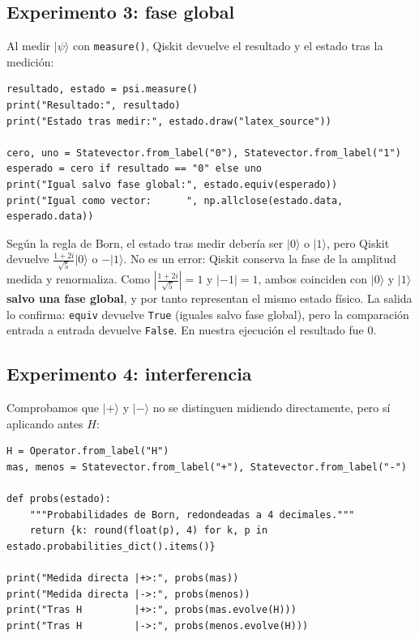 \documentclass[11pt, a4paper, twoside, openright]{report}
\begin{document}
\subsection{Experimento 3: fase global}

\noindent Al medir $|\psi\rangle$ con \texttt{measure()}, Qiskit devuelve el resultado y el estado tras la medición:
\begin{lstlisting}
resultado, estado = psi.measure()
print("Resultado:", resultado)
print("Estado tras medir:", estado.draw("latex_source"))

cero, uno = Statevector.from_label("0"), Statevector.from_label("1")
esperado = cero if resultado == "0" else uno
print("Igual salvo fase global:", estado.equiv(esperado))
print("Igual como vector:      ", np.allclose(estado.data, esperado.data))
\end{lstlisting}

\noindent Según la regla de Born, el estado tras medir debería ser $|0\rangle$ o $|1\rangle$, pero Qiskit devuelve $\frac{1+2i}{\sqrt 5}|0\rangle$ o $-|1\rangle$. No es un error: Qiskit conserva la fase de la amplitud medida y renormaliza. Como $\left|\frac{1+2i}{\sqrt5}\right| = 1$ y $|-1| = 1$, ambos coinciden con $|0\rangle$ y $|1\rangle$ \textbf{salvo una fase global}, y por tanto representan el mismo estado físico. La salida lo confirma: \texttt{equiv} devuelve \texttt{True} (iguales salvo fase global), pero la comparación entrada a entrada devuelve \texttt{False}.
En nuestra ejecución el resultado fue $0$.

\subsection{Experimento 4: interferencia}

\noindent Comprobamos que $|+\rangle$ y $|-\rangle$ no se distinguen midiendo directamente, pero sí aplicando antes $H$:
\begin{lstlisting}
H = Operator.from_label("H")
mas, menos = Statevector.from_label("+"), Statevector.from_label("-")

def probs(estado):
    """Probabilidades de Born, redondeadas a 4 decimales."""
    return {k: round(float(p), 4) for k, p in estado.probabilities_dict().items()}

print("Medida directa |+>:", probs(mas))
print("Medida directa |->:", probs(menos))
print("Tras H         |+>:", probs(mas.evolve(H)))
print("Tras H         |->:", probs(menos.evolve(H)))
\end{lstlisting}
\end{document}
